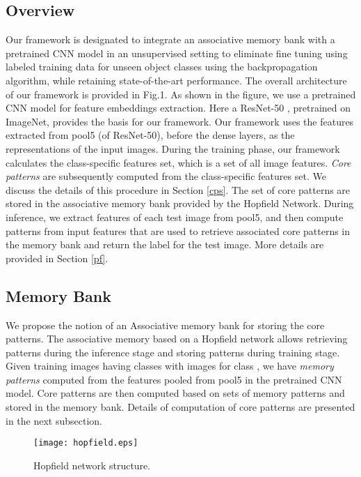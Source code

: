 \documentclass[conference]{IEEEtran}
\begin{document}
\subsection{Overview}\label{ov}
Our framework is designated to integrate an associative memory  bank with  a pretrained CNN model in an unsupervised setting to eliminate fine tuning using labeled training data for unseen object classes using  the backpropagation algorithm, while retaining state-of-the-art performance. The overall architecture of our framework is provided in Fig.1. As shown in the figure, we use a pretrained CNN model for feature embeddings extraction. Here a ResNet-50 \cite{he2016deep},  pretrained on ImageNet\cite{deng2009imagenet}, provides the basis for our framework.  Our framework uses the features  extracted from pool5 (of ResNet-50), before the dense layers, as the representations of the input images. During the training phase, our  framework calculates the class-specific features set, which is a set of all image features.   \emph{Core patterns}  are subsequently computed from the class-specific features set. We discuss  the details of this procedure in Section \ref{cps}. The set of core patterns  are stored in  the associative memory bank provided by the  Hopfield Network. During inference, we extract features of each test image from pool5, and then  compute patterns from input features that are used to retrieve  associated core patterns in  the memory bank and return the label for the test image.  More details are provided  in  Section \ref{pf}.

\subsection{Memory Bank}\label{mb}
We propose the notion of  an Associative memory bank for storing the core patterns.  The associative memory based on a  Hopfield network  allows retrieving patterns during the inference  stage and storing patterns during training stage. Given training images having   classes with  images for class , we have  \emph{memory patterns}  computed from the features  pooled from pool5 in the pretrained CNN model. Core patterns  are then computed based on  sets of memory patterns and stored in the memory bank. Details of computation of core patterns  are presented in the next subsection.

\begin{figure}[t!]
    \centering
    \texttt{[image: hopfield.eps]}
    \caption{Hopfield network structure.}
    \label{fig:hp}
\end{figure}
\end{document}

